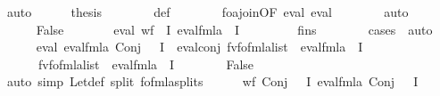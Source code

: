\begin{isabellebody}
\ auto\isanewline
\ \ \ \ \isamarkupfalse%
\ {\isacharquery}{\kern0pt}thesis\isanewline
\ \ \ \ \ \ \isamarkupfalse%
\ {\isasympsi}{\isacharunderscore}{\kern0pt}def\isanewline
\ \ \ \ \ \ \isamarkupfalse%
\ fo{\isacharunderscore}{\kern0pt}ajoin{\isacharbrackleft}{\kern0pt}OF\ eval{\isasymphi}\ eval{\isasympsi}{\isacharprime}{\kern0pt}{\isacharbrackright}{\kern0pt}\isanewline
\ \ \ \ \ \ \isamarkupfalse%
\ auto\isanewline
\ \ \isamarkupfalse%
\isanewline
\ \ \ \ \isamarkupfalse%
\ False\isanewline
\ \ \ \ \isamarkupfalse%
\ \isamarkupfalse%
\ eval{\isasympsi}{\isacharcolon}{\kern0pt}\ {\isachardoublequoteopen}wf\ {\isasympsi}\ I\ {\isacharparenleft}{\kern0pt}eval{\isacharunderscore}{\kern0pt}fmla\ {\isasympsi}\ I{\isacharparenright}{\kern0pt}{\isachardoublequoteclose}\isanewline
\ \ \ \ \ \ \isamarkupfalse%
\ {}\ fins{\isacharparenleft}{\kern0pt}{}{\isacharparenright}{\kern0pt}\isanewline
\ \ \ \ \ \ \isamarkupfalse%
\ {\isacharparenleft}{\kern0pt}cases\ {\isasympsi}{\isacharparenright}{\kern0pt}\ auto\isanewline
\ \ \ \ \isamarkupfalse%
\ eval{\isacharcolon}{\kern0pt}\ {\isachardoublequoteopen}eval{\isacharunderscore}{\kern0pt}fmla\ {\isacharparenleft}{\kern0pt}Conj\ {\isasymphi}\ {\isasympsi}{\isacharparenright}{\kern0pt}\ I\ {\isacharequal}{\kern0pt}\ eval{\isacharunderscore}{\kern0pt}conj\ {\isacharparenleft}{\kern0pt}fv{\isacharunderscore}{\kern0pt}fo{\isacharunderscore}{\kern0pt}fmla{\isacharunderscore}{\kern0pt}list\ {\isasymphi}{\isacharparenright}{\kern0pt}\ {\isacharparenleft}{\kern0pt}eval{\isacharunderscore}{\kern0pt}fmla\ {\isasymphi}\ I{\isacharparenright}{\kern0pt}\isanewline
\ \ \ \ \ \ {\isacharparenleft}{\kern0pt}fv{\isacharunderscore}{\kern0pt}fo{\isacharunderscore}{\kern0pt}fmla{\isacharunderscore}{\kern0pt}list\ {\isasympsi}{\isacharparenright}{\kern0pt}\ {\isacharparenleft}{\kern0pt}eval{\isacharunderscore}{\kern0pt}fmla\ {\isasympsi}\ I{\isacharparenright}{\kern0pt}{\isachardoublequoteclose}\isanewline
\ \ \ \ \ \ \isamarkupfalse%
\ False\isanewline
\ \ \ \ \ \ \isamarkupfalse%
\ {\isacharparenleft}{\kern0pt}auto\ simp{\isacharcolon}{\kern0pt}\ Let{\isacharunderscore}{\kern0pt}def\ split{\isacharcolon}{\kern0pt}\ fo{\isacharunderscore}{\kern0pt}fmla{\isachardot}{\kern0pt}splits{\isacharparenright}{\kern0pt}\isanewline
\ \ \ \ \isamarkupfalse%
\ {\isachardoublequoteopen}wf\ {\isacharparenleft}{\kern0pt}Conj\ {\isasymphi}\ {\isasympsi}{\isacharparenright}{\kern0pt}\ I\ {\isacharparenleft}{\kern0pt}eval{\isacharunderscore}{\kern0pt}fmla\ {\isacharparenleft}{\kern0pt}Conj\ {\isasymphi}\ {\isasympsi}{\isacharparenright}{\kern0pt}\ I{\isacharparenright}{\kern0pt}{\isachardoublequoteclose}\isanewline

\end{isabellebody}
